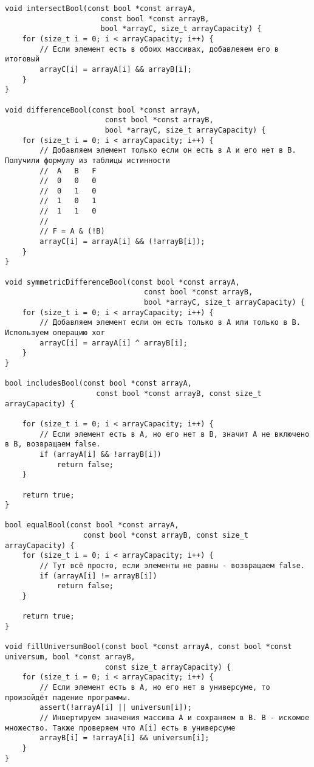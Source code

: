\documentclass[a4paper,14pt]{extarticle}
\begin{document}
\begin{enumerate}[№1. ]
\begin{enumerate}[label=\asbuk*),ref=\asbuk*]
\begin{verbatim}
void intersectBool(const bool *const arrayA,
                      const bool *const arrayB,
                      bool *arrayC, size_t arrayCapacity) {
    for (size_t i = 0; i < arrayCapacity; i++) {
        // Если элемент есть в обоих массивах, добавлеяем его в итоговый
        arrayC[i] = arrayA[i] && arrayB[i];
    }
}

void differenceBool(const bool *const arrayA,
                       const bool *const arrayB,
                       bool *arrayC, size_t arrayCapacity) {
    for (size_t i = 0; i < arrayCapacity; i++) {
        // Добавляем элемент только если он есть в A и его нет в B. Получили формулу из таблицы истинности
        //  A   B   F
        //  0   0   0
        //  0   1   0
        //  1   0   1
        //  1   1   0
        //
        // F = A & (!B)
        arrayC[i] = arrayA[i] && (!arrayB[i]);
    }
}

void symmetricDifferenceBool(const bool *const arrayA,
                                const bool *const arrayB,
                                bool *arrayC, size_t arrayCapacity) {
    for (size_t i = 0; i < arrayCapacity; i++) {
        // Добавляем элемент если он есть только в A или только в B. Используем операцию xor
        arrayC[i] = arrayA[i] ^ arrayB[i];
    }
}

bool includesBool(const bool *const arrayA,
                     const bool *const arrayB, const size_t arrayCapacity) {

    for (size_t i = 0; i < arrayCapacity; i++) {
        // Если элемент есть в A, но его нет в B, значит A не включено в B, возвращаем false.
        if (arrayA[i] && !arrayB[i])
            return false;
    }

    return true;
}

bool equalBool(const bool *const arrayA,
                  const bool *const arrayB, const size_t arrayCapacity) {
    for (size_t i = 0; i < arrayCapacity; i++) {
        // Тут всё просто, если элементы не равны - возвращаем false.
        if (arrayA[i] != arrayB[i])
            return false;
    }

    return true;
}

void fillUniversumBool(const bool *const arrayA, const bool *const universum, bool *const arrayB,
                       const size_t arrayCapacity) {
    for (size_t i = 0; i < arrayCapacity; i++) {
        // Если элемент есть в A, но его нет в универсуме, то произойдёт падение программы.
        assert(!arrayA[i] || universum[i]);
        // Инвертируем значения массива A и сохраняем в B. B - искомое множество. Также проверяем что A[i] есть в универсуме
        arrayB[i] = !arrayA[i] && universum[i];
    }
}


\end{verbatim}
\end{enumerate}
\end{enumerate}
\end{document}
